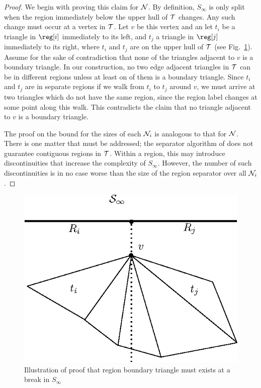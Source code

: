 \begin{proof}
We begin with proving this claim for $\mathcal{N}$.
By definition, $S_{\infty}$ is only split when the region immediately
below the upper hull of $\mathcal{T}$ changes.
Any such change must occur at a vertex in $\mathcal{T}$.
Let $v$ be this vertex and an let $t_i$ be a triangle in $\reg[i]$ 
immediately to its left, and $t_j$ a triangle in $\reg[j]$ immediately
to its right, where $t_i$ and $t_j$ are on the upper hull of
$\mathcal{T}$ (see Fig.~\ref{fig:pl_s_infty}).
Assume for the sake of contradiction that none of the triangles
adjacent to $v$ is a boundary triangle. 
In our construction, no two edge adjacent triangles in $\mathcal{T}$
can be in different regions unless at least on of them is
a boundary triangle.
Since $t_i$ and $t_j$ are in separate regions if we walk 
from $t_i$ to $t_j$ around $v$, we must arrive at two 
triangles which do not have the same region, since the
region label changes at some point along this walk.
This contradicts the claim that no triangle adjacent to $v$ is 
a boundary triangle.

The proof on the bound for the sizes of each $\mathcal{N}_i$ is 
analogous to that for $\mathcal{N}$.
There is one matter that must be addressed;
the separator algorithm of \cite{Frederickson87} does
not guarantee contiguous regions in $\mathcal{T}$.
Within a region, this may introduce discontinuities 
that increase the complexity of $S_{\infty}$.
However, the number of such discontinuities is in no case
worse than the size of the region separator over
all $\mathcal{N}_i$. 

\end{proof}

\begin{figure}
  \centering
  \includegraphics[scale=1.0]{Fig6}
  \caption[Bound on size of $\mathcal{S}_{\infty}$]{
  Illustration of proof that region boundary triangle must
  exists at a break in $S_{\infty}$
  }
  \label{fig:pl_s_infty}
\end{figure}


